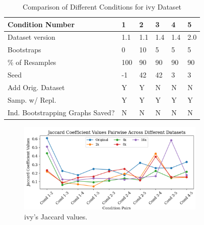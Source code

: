 \documentclass[sigconf,review,anonymous,nonacm=true]{acmart}
\begin{document}
\begin{table}[h]
\centering
\caption{Comparison of Different Conditions for ivy Dataset}
\label{tab:conditions4}
\begin{tabularx}{0.5\textwidth}{|l|X|X|X|X|X|}
\hline
\textbf{Condition Number}        & \textbf{1} & \textbf{2} & \textbf{3} & \textbf{4} & \textbf{5}  \\ \hline
Dataset version                  & 1.1          & 1.1          & 1.4          & 1.4          & 2.0            \\ \hline
Bootstraps                & 0                & 10               & 5              & 5               & 5                \\ \hline
\% of Resamples           & 100            & 90            & 90            & 90            & 90                   \\ \hline
Seed                      & -1          & 42               & 42              & 3          & 3                        \\ \hline
Add Orig. Dataset         & Y                & Y                & N                & N                & N                        \\ \hline
Samp. w/ Repl.            & Y                & Y               & Y                & Y               & Y                \\ \hline
Ind. Bootstrapping Graphs Saved?         & N                & N                & N                & N                & N               \\ \hline
\end{tabularx}
\end{table}

\begin{figure}[h]
\caption{ivy's Jaccard values.}\label{ivyjacard}
\includegraphics[width=9cm]{images/ivy.png}
\end{figure}
\end{document}
